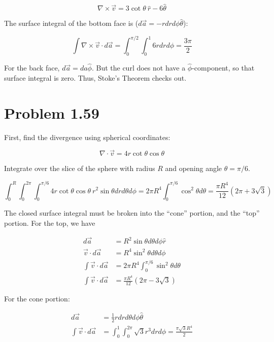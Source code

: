 \documentclass[10pt]{article}
\begin{document}
\begin{equation}
\nabla \times \vec{v} = 3 \cot\theta ~ \hat{r} - 6 \hat{\theta}
\end{equation}

The surface integral of the bottom face is ($d\vec{a} = -r dr d\phi \hat{\theta}$):

\begin{equation}
\int \nabla \times \vec{v} \cdot d\vec{a} = \int_0^{\pi/2} \int_0^{1} 6 r dr d\phi = \frac{3\pi}{2}
\end{equation}

For the back face, $d\vec{a} = da \hat{\phi}$.  But the curl does not have a $\hat{\phi}$-component, so that surface integral is zero. Thus, Stoke's Theorem checks out.

\section{Problem 1.59}

First, find the divergence using spherical coordinates:

\begin{equation}
\nabla \cdot \vec{v} = 4 r \cot\theta\cos\theta
\end{equation}

Integrate over the slice of the sphere with radius $R$ and opening angle $\theta = \pi/6$.

\begin{equation}
\int_0^{R} \int_0^{2\pi} \int_0^{\pi/6} 4 r \cot\theta\cos\theta ~ r^2 \sin\theta dr d\theta d\phi = 2\pi R^4 \int_0^{\pi/6} \cos^2\theta d\theta = \boxed{\frac{\pi R^4}{12}(2\pi + 3\sqrt{3})}
\end{equation}

The closed surface integral must be broken into the ``cone'' portion, and the ``top'' portion.  For the top, we have

\begin{align}
d\vec{a} &= R^2 \sin\theta d\theta d\phi \hat{r} \\
\vec{v} \cdot d\vec{a} &= R^4 \sin^2\theta d\theta d\phi \\
\int \vec{v} \cdot d\vec{a} &= 2\pi R^4 \int_{0}^{\pi/6} \sin^2\theta d\theta \\
\int \vec{v} \cdot d\vec{a} &= \frac{\pi R^4}{12}(2\pi - 3\sqrt{3})
\end{align}

For the cone portion:

\begin{align}
d\vec{a} &= \frac{1}{2} r dr d\theta d\phi \hat{\theta} \\
\int \vec{v} \cdot d\vec{a} &= \int_0^{1} \int_{0}^{2\pi} \sqrt{3} r^3 dr d\phi = \frac{\pi \sqrt{3} R^4}{2} 
\end{align}
\end{document}
